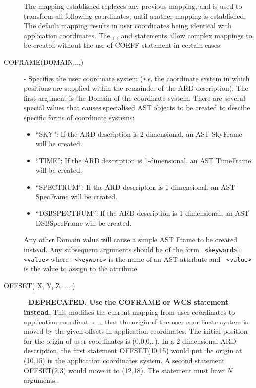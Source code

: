 \documentclass[11pt]{starlink}
\begin{document}
\begin{description}
The mapping established replaces any previous mapping, and is used to transform
all following coordinates, until another mapping is established. The default
mapping results in user coordinates being identical with application
coordinates. The , ,  and  statements allow complex
mappings to be created without the use of COEFF statement in certain cases.

\item [\label{ST:COFRAME}COFRAME(DOMAIN,...)] - Specifies the user
coordinate system (\emph{i.e.} the coordinate system in which positions
are supplied within the remainder of the ARD description). The first
argument is the Domain of the coordinate system. There are several
special values that causes specialised AST objects to be created to
descibe specific forms of coordinate systems:

\begin{itemize}
\item ``SKY'': If the ARD description is 2-dimensional, an AST SkyFrame will
be created.
\item ``TIME'': If the ARD description is 1-dimensional, an AST TimeFrame will
be created.
\item ``SPECTRUM'': If the ARD description is 1-dimensional, an AST SpecFrame
will be created.
\item ``DSBSPECTRUM'': If the ARD description is 1-dimensional, an AST DSBSpecFrame
will be created.
\end{itemize}

Any other Domain value will cause a simple AST Frame to be created
instead. Any subsequent arguments should be of the form \texttt{
<keyword>=<value>} where \texttt{ <keyword>} is the name of an AST attribute
and \texttt{ <value>} is the value to assign to the attribute.

\item [\label{ST:OFF}OFFSET( X, Y, Z, ... )] - \textbf{DEPRECATED. Use the COFRAME or WCS statement instead.} This modifies the current mapping
from user coordinates to application coordinates so that the origin of the
user coordinate system is moved by the given offsets in application
coordinates. The initial position for the origin of user coordinates is
(0,0,0,..). In a 2-dimensional ARD description, the first statement OFFSET(10,15)
would put the origin at (10,15) in the application coordinates system. A second
statement OFFSET(2,3) would move it to (12,18). The statement must have $N$
arguments.


\end{description}
\end{document}
